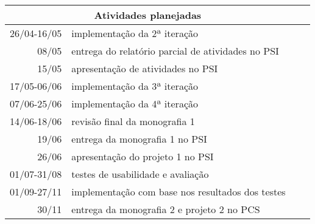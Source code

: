 \documentclass[a4paper,12pt,font=plain,header=plain]{abnt}
\begin{document}
	\begin{tabularx}{0.9\linewidth}[|l|]{ |r|X|l|X| }
	\hline
		\multicolumn{2}{|c|}{\textbf{Atividades planejadas}} \\
	\hline
		26/04-16/05 & implementação da 2ª iteração \\
	\hline
		08/05 & entrega do relatório parcial de atividades no PSI \\
	\hline
		15/05 & apresentação de atividades no PSI \\
	\hline
		17/05-06/06 & implementação da 3ª iteração \\
	\hline
		07/06-25/06 & implementação da 4ª iteração \\
	\hline
		14/06-18/06 & revisão final da monografia 1 \\
	\hline
		19/06 & entrega da monografia 1 no PSI \\
	\hline
		26/06 & apresentação do projeto 1 no PSI \\
	\hline
		01/07-31/08 & testes de usabilidade e avaliação \\
	\hline
		01/09-27/11 & implementação com base nos resultados dos testes \\
	\hline
		30/11 & entrega da monografia 2 e projeto 2 no PCS \\
	\hline
	\end{tabularx} \\

  	
\end{document}
